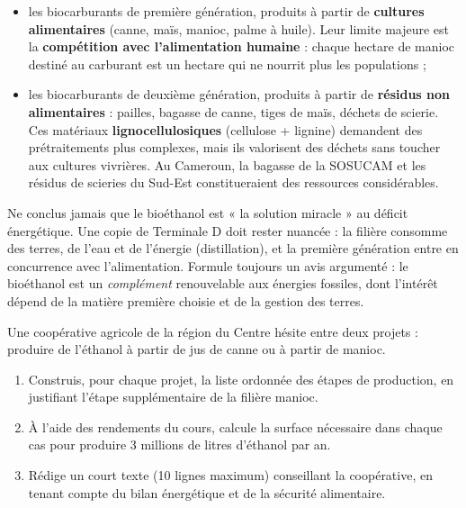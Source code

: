 \documentclass[11pt]{article}
\newcommand{\cle}[1]{{\popxbold\color{popdark}#1}}
\begin{document}
\begin{itemize}
\item les \cle{biocarburants de première génération}, produits à partir de \textbf{cultures alimentaires} (canne, maïs, manioc, palme à huile). Leur limite majeure est la \textbf{compétition avec l'alimentation humaine} : chaque hectare de manioc destiné au carburant est un hectare qui ne nourrit plus les populations ;
\item les \cle{biocarburants de deuxième génération}, produits à partir de \textbf{résidus non alimentaires} : pailles, bagasse de canne, tiges de maïs, déchets de scierie. Ces matériaux \textbf{lignocellulosiques} (cellulose + lignine) demandent des prétraitements plus complexes, mais ils valorisent des déchets sans toucher aux cultures vivrières. Au Cameroun, la bagasse de la SOSUCAM et les résidus de scieries du Sud-Est constitueraient des ressources considérables.
\end{itemize}

\begin{attention}
Ne conclus jamais que le bioéthanol est « la solution miracle » au déficit énergétique. Une copie de Terminale D doit rester nuancée : la filière consomme des terres, de l'eau et de l'énergie (distillation), et la première génération entre en concurrence avec l'alimentation. Formule toujours un avis argumenté : le bioéthanol est un \emph{complément} renouvelable aux énergies fossiles, dont l'intérêt dépend de la matière première choisie et de la gestion des terres.
\end{attention}

\begin{exercice}
Une coopérative agricole de la région du Centre hésite entre deux projets : produire de l'éthanol à partir de jus de canne ou à partir de manioc.
\begin{enumerate}
\item Construis, pour chaque projet, la liste ordonnée des étapes de production, en justifiant l'étape supplémentaire de la filière manioc.
\item À l'aide des rendements du cours, calcule la surface nécessaire dans chaque cas pour produire 3 millions de litres d'éthanol par an.
\item Rédige un court texte (10 lignes maximum) conseillant la coopérative, en tenant compte du bilan énergétique et de la sécurité alimentaire.
\end{enumerate}
\end{exercice}
\end{document}
